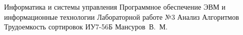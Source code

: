 \makereporttitle
{Информатика и системы управления}
{Программное обеспечение ЭВМ и информационные технологии}
{Лабораторной работе №3}
{Анализ Алгоритмов}
{Трудоемкость сортировок}
{}
{ИУ7-56Б}
{Мансуров~В.~М.}
{}

\maketableofcontents
\setcounter{page}{1}
	